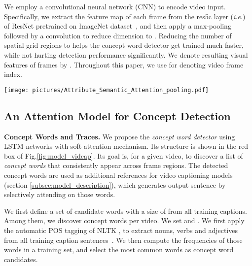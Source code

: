\documentclass[10pt,twocolumn,letterpaper]{article}
\makeatletter
\theoremstyle{nonumberplain}
\DeclareRobustCommand\onedot{\futurelet\@let@token\@onedot}
\def\onedot{.\@\xspace}
\def\ie{\emph{i.e}\onedot} \def\Ie{\emph{I.e}\onedot}
\makeatother
\begin{document}
We employ a convolutional neural network (CNN) to encode video input.
Specifically, we extract the feature map of each frame from the res5c layer
(\ie )
of ResNet \cite{he-arxiv-2015} pretrained on ImageNet dataset~\cite{imagenet-ijcv-2015},
and then apply a  max-pooling followed by a  convolution
to reduce dimension to .
Reducing the number of spatial grid regions to  helps the concept word detector
get trained much faster, while not hurting detection performance significantly. We denote resulting visual features of frames by .
Throughout this paper, we use  for denoting video frame index.



\begin{figure*}\centering
\texttt{[image: pictures/Attribute\_Semantic\_Attention\_pooling.pdf]}
\caption{
    The architecture of the concept word detection in a top red box (section \ref{subsec:model_attributeword}),
    and our video description model in bottom, which uses semantic attention on the detected concept words (section \ref{subsec:model_description}).
}
\label{fig:model_vidcap}
\vspace{-5pt}
\end{figure*}

\subsection{An Attention Model for Concept Detection}
\label{subsec:model_attributeword}


\textbf{Concept Words and Traces.}
We propose the \emph{concept word detector} using LSTM networks with soft attention mechanism.
Its structure is shown in the red box of Fig.\ref{fig:model_vidcap}.
Its goal is, for a given video, to discover a list of \emph{concept words} that consistently appear across frame regions.
The detected concept words are used as additional references for video captioning models (section \ref{subsec:model_description}),
which generates output sentence by selectively attending on those words.

We first define a set of candidate words with a size of  from all training captions.
Among them, we discover  concept words per video. We set  and . We first apply the automatic POS tagging of NLTK \cite{nltk}, to extract nouns, verbs and adjectives from all training caption sentences~\cite{fang-cvpr-2015}.
We then compute the frequencies of those words in a training set, and select the  most common words as concept word candidates.
\end{document}
